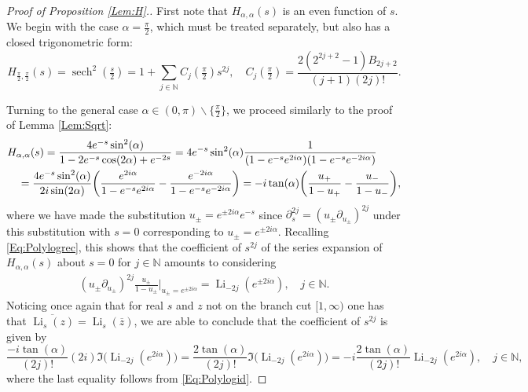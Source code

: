 \documentclass[letterpaper,10pt]{amsart}
\DeclareMathOperator{\Li}{Li}
\DeclareMathOperator{\sech}{sech}
\numberwithin{equation}{section}
\begin{document}
\begin{proof}[Proof of Proposition \ref{Lem:H}.]
First note that $H_{\alpha,\alpha}(s)$ is an even function of $s$. We begin with the case $\alpha=\tfrac{\pi}{2}$, which must be treated separately, but also has a closed trigonometric form:
\begin{equation}
H_{\tfrac{\pi}{2},\tfrac{\pi}{2}}(s)=\sech^2(\tfrac{s}{2})=1+\sum_{j\in\mathbb{N}} C_j(\tfrac{\pi}{2}) s^{2j},\quad C_j(\tfrac{\pi}{2})=\frac{2(2^{2j+2}-1)B_{2j+2}}{(j+1)(2j)!}.
\end{equation}

Turning to the general case $\alpha\in(0,\pi)\backslash\{\tfrac{\pi}{2}\}$, we proceed similarly to the proof of Lemma \ref{Lem:Sqrt}:
\begin{align}
& H_{\alpha,\alpha}(s)=\frac{4e^{-s}\sin^2(\alpha)}{1-2e^{-s}\cos(2\alpha)+e^{-2s}}=4e^{-s}\sin^2(\alpha)\frac{1}{(1-e^{-s}e^{2i\alpha})(1-e^{-s}e^{-2i\alpha})}\\
&\quad =\frac{4e^{-s}\sin^2(\alpha)}{2i\sin(2\alpha)}\bigg(\frac{e^{2i\alpha}}{1-e^{-s}e^{2i\alpha}}-\frac{e^{-2i\alpha}}{1-e^{-s}e^{-2i\alpha}}\bigg)=-i\tan(\alpha)\bigg(\frac{u_+}{1-u_+}-\frac{u_-}{1-u_-}\bigg),\notag
\end{align}
where we have made the substitution $u_\pm =e^{\pm 2i\alpha}e^{-s}$ since $\partial_s^{2j}=(u_\pm\partial_{u_\pm} )^{2j}$ under this substitution with $s=0$ corresponding to $u_\pm=e^{\pm 2i\alpha}$.
Recalling \eqref{Eq:Polylogrec}, this shows that the coefficient of $s^{2j}$ of the series expansion of $H_{\alpha,\alpha}(s)$ about $s=0$ for $j\in\mathbb{N}$ amounts to considering
\begin{align}
(u_\pm\partial_{u_\pm})^{2j}\frac{u_\pm}{1-u_\pm}\bigg|_{u_\pm =e^{\pm 2i\alpha}}=\Li_{-2j}(e^{\pm 2i\alpha}),\quad j\in\mathbb{N}.
\end{align}
Noticing once again that for real $s$ and $z$ not on the branch cut $[1,\infty)$ one has that $\overline{\Li_s(z)}=\Li_s(\overline{z})$, we are able to conclude that the coefficient of $s^{2j}$ is given by
\begin{equation}
\frac{-i\tan(\alpha)}{(2j)!}(2i)\Im\big(\Li_{-2j}(e^{2i\alpha})\big)=\frac{2\tan(\alpha)}{(2j)!}\Im\big(\Li_{-2j}(e^{2i\alpha})\big)=-i\frac{2\tan(\alpha)}{(2j)!}\Li_{-2j}(e^{2i\alpha}),\quad j\in\mathbb{N},
\end{equation}
where the last equality follows from \eqref{Eq:Polylogid}.
\end{proof}
\end{document}
